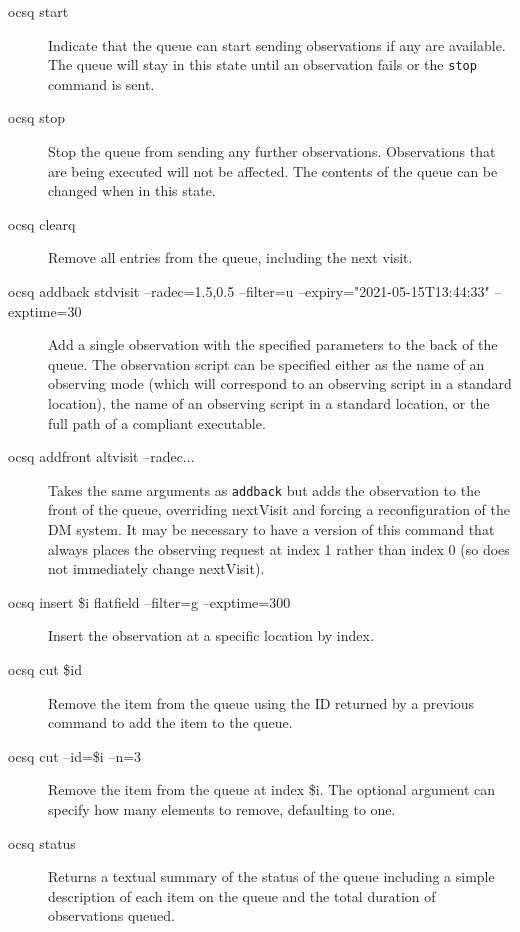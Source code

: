 \documentclass[TS,toc,lsstdraft]{lsstdoc}
\begin{document}
\begin{description}

\item[ocsq start] \hfill

Indicate that the queue can start sending observations if any are available.
The queue will stay in this state until an observation fails or the \texttt{stop} command is sent.

\item[ocsq stop] \hfill

Stop the queue from sending any further observations.
Observations that are being executed will not be affected.
The contents of the queue can be changed when in this state.

\item[ocsq clearq] \hfill

Remove all entries from the queue, including the next visit.

\item[ocsq addback stdvisit --radec=1.5,0.5 --filter=u --expiry="2021-05-15T13:44:33" --exptime=30]

Add a single observation with the specified parameters to the back of the queue.
The observation script can be specified either as the name of an observing mode (which will correspond to an observing script in a standard location), the name of an observing script in a standard location, or the full path of a compliant executable.

\item[ocsq addfront altvisit --radec...]

Takes the same arguments as \texttt{addback} but adds the observation to the front of the queue, overriding nextVisit and forcing a reconfiguration of the DM system.
It may be necessary to have a version of this command that always places the observing request at index 1 rather than index 0 (so does not immediately change nextVisit).

\item[ocsq insert \$i flatfield --filter=g --exptime=300]

Insert the observation at a specific location by index.

\item[ocsq cut \$id]

Remove the item from the queue using the ID returned by a previous command to add the item to the queue.

\item[ocsq cut --id=\$i --n=3]

Remove the item from the queue at index \$i.
The optional argument can specify how many elements to remove, defaulting to one.

\item[ocsq status]

Returns a textual summary of the status of the queue including a simple description of each item on the queue and the total duration of observations queued.

\end{description}
\end{document}
